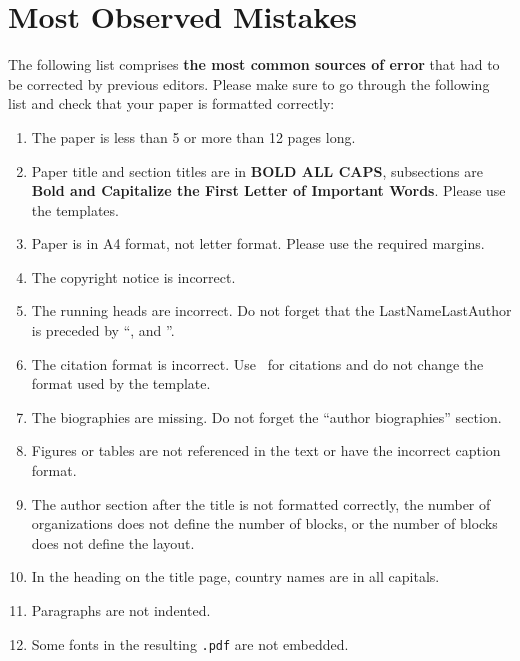 \documentclass{scspaperproc}
\theoremstyle{scsthe}
\begin{document}
\section{Most Observed Mistakes}

The following list comprises \textbf{the most common sources of error} that had to be corrected by previous editors. Please make sure to go through the following list and check that your paper is formatted correctly:
\begin{enumerate}
	\item	The paper is less than 5 or more than 12 pages long.
	\item	Paper title and section titles are in \textbf{BOLD ALL CAPS}, subsections are \textbf{Bold and Capitalize the First Letter of Important Words}. Please use the templates.
	\item	Paper is in A4 format, not letter format. Please use the required margins.
	\item	The copyright notice is incorrect.
	\item	The running heads are incorrect. Do not forget that the LastNameLastAuthor is preceded by ``, and ''.
	\item	The citation format is incorrect. Use \BibTeX\ for citations and do not change the format used by the template.
	\item	The biographies are missing. Do not forget the ``author biographies'' section.
	\item	Figures or tables are not referenced in the text or have the incorrect caption format.
	\item	The author section after the title is not formatted correctly, the number of organizations does not define the number of blocks, or the number of blocks does not define the layout.
	\item In the heading on the title page, country names are in all capitals.
	\item	Paragraphs are not indented.
	\item Some fonts in the resulting \texttt{.pdf} are not embedded.
\end{enumerate}
\end{document}
